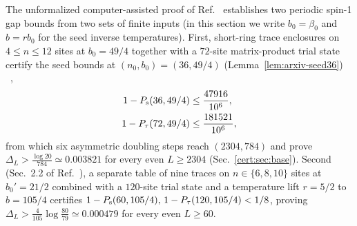 
The unformalized computer-assisted proof of Ref.~\cite{OpenAI2026Periodic}
establishes two periodic spin-1 gap bounds from two sets of finite
inputs (in this section we write $b_0=\beta_0$ and $b=rb_0$ for the seed
inverse temperatures). First, short-ring trace enclosures on
$4\le n\le12$ sites at $b_0=49/4$ together with a $72$-site
matrix-product trial state certify the seed bounds at
$(n_0,b_0)=(36,49/4)$ (Lemma~\ref{lem:arxiv-seed36})%
~,
\begin{align}
    1-P_{\mathrm s}(36,49/4) &\le\frac{47916}{10^6},\notag\\
    1-P_{\tau}(72,49/4) &\le\frac{181521}{10^6},
    \label{cert:eq:base}
\end{align}
from which six asymmetric doubling steps reach $(2304,784)$ and prove
$\Delta_L>\tfrac{\log20}{784}\simeq0.003821$ for every even $L\ge2304$
(Sec.~\ref{cert:sec:base}). Second (Sec.~2.2 of
Ref.~\cite{OpenAI2026Periodic}), a separate table of nine traces on
$n\in\{6,8,10\}$ sites at $b_0'=21/2$ combined with a $120$-site trial
state and a temperature lift $r=5/2$ to $b=105/4$ certifies
$1-P_{\mathrm s}(60,105/4),\,1-P_{\tau}(120,105/4)<1/8$, proving
$\Delta_L>\frac{4}{105}\log\frac{80}{79}\simeq0.000479$ for every even
$L\ge60$.

